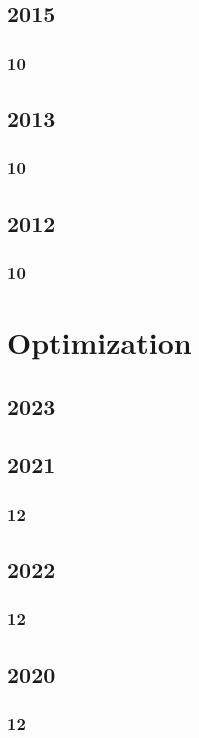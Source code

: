 \documentclass[11pt]{book}
\begin{document}
\section{2015}
\subsection{10}

\section{2013}
\subsection{10}

\section{2012}
\subsection{10}





\chapter{Optimization}
\section{2023}

\section{2021}
\subsection{12}

\section{2022}
\subsection{12}

\section{2020}
\subsection{12}

\end{document}
